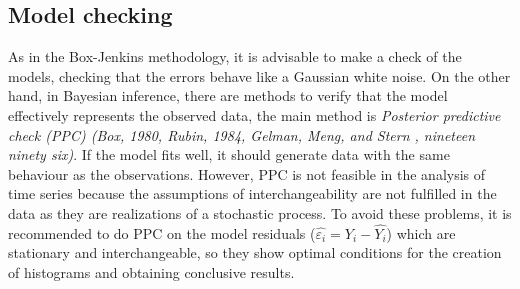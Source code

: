\subsection{Model checking}
As in the Box-Jenkins methodology, it is advisable to make a check of the models, checking that the errors behave like a Gaussian white noise. On the other hand, in Bayesian inference, there are methods to verify that the model effectively represents the observed data, the main method is \textit{Posterior predictive check (PPC) (Box, 1980, Rubin, 1984, Gelman, Meng, and Stern , nineteen ninety six)}. If the model fits well, it should generate data with the same behaviour as the observations. However, PPC is not feasible in the analysis of time series because the assumptions of interchangeability are not fulfilled in the data as they are realizations of a stochastic process. To avoid these problems, it is recommended to do PPC on the model residuals ($\widehat {\varepsilon_i}=Y_i-\widehat{Y_i}$) which are stationary and interchangeable, so they show optimal conditions for the creation of histograms and obtaining conclusive results.
%

